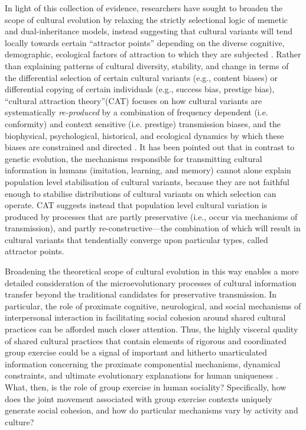 \begin{mccorrection}
  In light of this collection of evidence, researchers have sought to broaden the scope of cultural evolution by relaxing the strictly selectional logic of memetic and dual-inheritance models, instead suggesting that cultural variants will tend locally towards certain ``attractor points'' depending on the diverse cognitive, demographic, ecological factors of attraction to which they are subjected \citep{Sperber1996}.
  Rather than explaining patterns of cultural diversity, stability, and change in terms of the differential selection of certain cultural variants (e.g., content biases) or differential copying of certain individuals (e.g., success bias, prestige bias),  ``cultural attraction theory''(CAT) focuses on how cultural variants are systematically \textit{re-produced} by a combination of frequency dependent (i.e. conformity) and context sensitive (i.e. prestige) transmission biases, and the biophysical, psychological, historical, and ecological dynamics by which these biases are constrained and directed \citep{Claidiere2014}.  It has been pointed out that in contrast to genetic evolution, the mechanisms responsible for transmitting cultural information in humans (imitation, learning, and memory) cannot alone explain population level stabilisation of cultural variants,
  because they are not faithful enough to stabilise distributions of cultural variants on which selection can operate\cite{Claidiere2014}. CAT suggests instead that population level cultural variation is produced by processes that are partly preservative (i.e., occur via mechanisms of transmission), and partly re-constructive---the combination of which will result in cultural variants that tendentially converge upon particular types, called attractor points.

  Broadening the theoretical scope of cultural evolution in this way enables a more detailed consideration of the microevolutionary processes of cultural information transfer beyond the traditional candidates for preservative transmission. In particular, the role of proximate cognitive, neurological, and social mechanisms of interpersonal interaction in facilitating social cohesion around shared cultural practices can be afforded much closer attention.  Thus, the highly visceral quality of shared cultural practices that contain elements of rigorous and coordinated group exercise could be a signal of important and hitherto unarticulated information concerning the proximate componential mechanisms, dynamical constraints, and ultimate evolutionary explanations for human uniqueness \citep[3]{Claidiere2014}.  What, then, is the role of group exercise in human sociality? Specifically, how does the joint movement associated with group exercise contexts uniquely generate social cohesion, and how do particular mechanisms vary by activity and culture?


\end{mccorrection}
